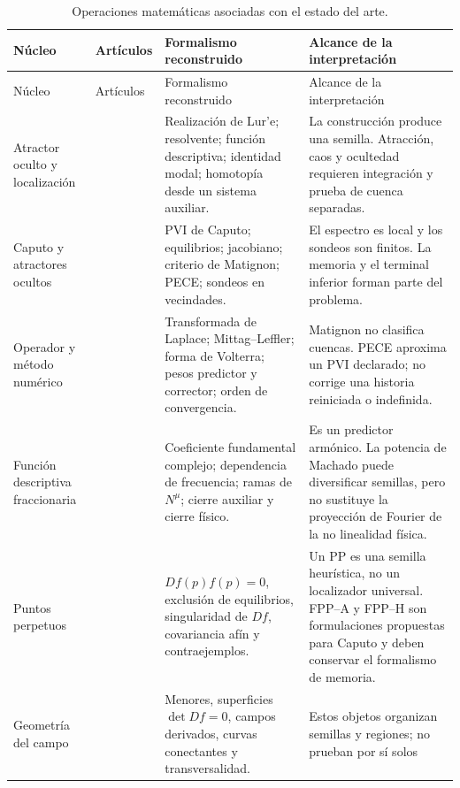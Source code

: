 \begin{longtable}{@{}L{0.16\textwidth}L{0.22\textwidth}L{0.28\textwidth}L{0.26\textwidth}@{}}
\caption{Operaciones matemáticas asociadas con el estado del arte.}
\label{tab:articulos-operaciones}\\
\toprule
Núcleo & Artículos & Formalismo reconstruido & Alcance de la interpretación \\
\midrule
\endfirsthead
\toprule
Núcleo & Artículos & Formalismo reconstruido & Alcance de la interpretación \\
\midrule
\endhead
Atractor oculto y localización
& \cite{LeonovKuznetsovVagaitsev2011,LeonovKuznetsov2013,KuznetsovEtAl2017}
& Realización de Lur'e; resolvente; función descriptiva; identidad modal;
homotopía desde un sistema auxiliar.
& La construcción produce una semilla. Atracción, caos y ocultedad requieren
integración y prueba de cuenca separadas. \\
Caputo y atractores ocultos
& \cite{Danca2017,Danca2017HiddenFO}
& PVI de Caputo; equilibrios; jacobiano; criterio de Matignon; PECE; sondeos en
vecindades.
& El espectro es local y los sondeos son finitos. La memoria y el terminal
inferior forman parte del problema. \\
Operador y método numérico
& \cite{Matignon1996,DiethelmFordFreed2002}
& Transformada de Laplace; Mittag--Leffler; forma de Volterra; pesos predictor
y corrector; orden de convergencia.
& Matignon no clasifica cuencas. PECE aproxima un PVI declarado; no corrige una
historia reiniciada o indefinida. \\
Función descriptiva fraccionaria
& \cite{BarbosaMachado2002BacklashImpact,Machado2015FDF}
& Coeficiente fundamental complejo; dependencia de frecuencia; ramas de
\(N^\mu\); cierre auxiliar y cierre físico.
& Es un predictor armónico. La potencia de Machado puede diversificar semillas,
pero no sustituye la proyección de Fourier de la no linealidad física. \\
Puntos perpetuos
& \cite{Prasad2015Perpetual,DudkowskiPrasadKapitaniak2017,NazarimehrSaediJafari2017}
& \(Df(p)f(p)=0\), exclusión de equilibrios, singularidad de \(Df\),
covariancia afín y contraejemplos.
& Un PP es una semilla heurística, no un localizador universal. FPP--A y FPP--H
son formulaciones propuestas para Caputo y deben conservar el formalismo de
memoria. \\
Geometría del campo
& \cite{GuanXie2021Connecting,GodaraEtAl2018CriticalSurfaces}
& Menores, superficies \(\det Df=0\), campos derivados, curvas conectantes y
transversalidad.
& Estos objetos organizan semillas y regiones; no prueban por sí solos

\end{longtable}
